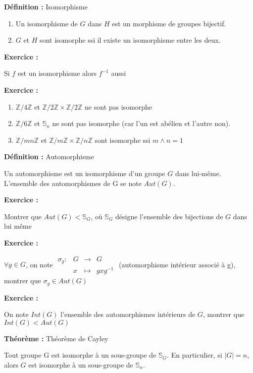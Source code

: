 \documentclass{report}
\newenvironment{definition}[1][]{
    \begin{tcolorbox}[colframe= white]
    \textbf{Définition :} 
    #1 \par
    }
    {\end{tcolorbox}}
\newenvironment{exo}{\begin{tcolorbox}[colframe= white]
    \textbf{Exercice :}
    \par}
    {\end{tcolorbox}}
\newenvironment{theoreme}[1][]{
    \begin{tcolorbox}[]
    \textbf{Théorème :} #1  \par} 
    {\end{tcolorbox}}
\newcommand{\fonction}[5]{
    \begin{array}{l|rcl}
    #1: & #2 & \longrightarrow & #3 \\
        & #4 & \longmapsto & #5 
    \end{array}
}
\newcommand{\Z}{\mathbb{Z}}
\newcommand{\znz}{\Z/n\Z}
\newcommand{\sn}{\mathbb{S}_n}
\begin{document}
\begin{definition}[Isomorphisme]
\begin{enumerate}
    \item Un isomorphisme de $G$ dans $H$ est un morphisme de groupes bijectif.
    \item $G$ et $H$ sont isomorphe ssi il existe un isomorphisme entre les deux.
\end{enumerate}
\end{definition}

\begin{exo}
    Si $f$ est un isomorphisme alors $f^{-1}$ aussi
\end{exo}

\begin{exo}
\begin{enumerate}
    \item $\Z /4\Z$ et $\Z/2\Z \times \Z/2\Z$ ne sont pas isomorphe
    \item $\Z/6\Z$ et $\mathbb{S}_n$ ne sont pas isomorphe (car l'un est abélien et l'autre non).
    \item $\Z/mn\Z$ et $\Z/m\Z \times \znz$ sont isomorphe ssi $m\wedge n = 1$
\end{enumerate}
\end{exo}

\begin{definition}[Automorphisme]
    Un automorphisme est un isomorphisme d'un groupe $G$ dans lui-même. L'ensemble des automorphismes de G se note $Aut(G)$.
\end{definition}

\begin{exo}
    Montrer que $Aut(G) < \mathbb{S}_G$, où $\mathbb{S}_{G}$ désigne l'ensemble des bijections de $G$ dans lui même
\end{exo}

\begin{exo}
    $\forall g\in G$, on note $\fonction{\sigma_g}{G}{G}{x}{gxg^{-1}}$ (automorphisme intérieur associé à g), montrer que $\sigma_g \in Aut(G)$
\end{exo}

\begin{exo}
    On note $Int(G)$ l'ensemble des automorphismes intérieurs de $G$, montrer que $Int(G) < Aut(G)$
\end{exo}

\begin{theoreme}[Théorème de Cayley]
    Tout groupe G est isomorphe à un sous-groupe de $\mathbb{S}_G$. En particulier, si $|G| = n$, alors $G$ est isomorphe à un sous-groupe de $\sn$.
\end{theoreme}
\end{document}
